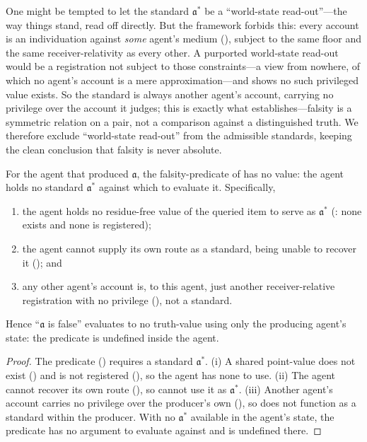 \documentclass[11pt,twocolumn,a4paper]{article}
\newcommand{\acct}{\mathfrak{a}}   %
\begin{document}
\begin{remark}
\label{rem:no-worldreadout}
One might be tempted to let the standard $\acct^\ast$ be a ``world-state
read-out''---the way things stand, read off directly. But the framework
forbids this: every account is an individuation against \emph{some} agent's
medium (), subject to the same floor and the same
receiver-relativity as every other. A purported world-state read-out would
be a registration not subject to those constraints---a view from nowhere, of
which no agent's account is a mere approximation---and 
shows no such privileged value exists. So the standard is always another
agent's account, carrying no privilege over the account it judges; this is
exactly what  establishes---falsity is a symmetric
relation on a pair, not a comparison against a distinguished truth. We
therefore exclude ``world-state read-out'' from the admissible standards,
keeping the clean conclusion that falsity is never absolute.
\end{remark}

\begin{theorem}
\label{thm:falsityundefined}
For the agent that produced $\acct$, the falsity-predicate of
 has no value: the agent holds no standard $\acct^\ast$
against which to evaluate it. Specifically,
\begin{enumerate}[label=\textup{(\roman*)},leftmargin=2.2em]
\item the agent holds no residue-free value of the queried item to serve as
$\acct^\ast$ (:
none exists and none is registered);
\item the agent cannot supply its own route as a standard, being unable to
recover it (); and
\item any other agent's account is, to this agent, just another
receiver-relative registration with no privilege (),
not a standard.
\end{enumerate}
Hence ``$\acct$ is false'' evaluates to no truth-value using only the
producing agent's state: the predicate is undefined inside the agent.
\end{theorem}

\begin{proof}
The predicate () requires a standard $\acct^\ast$. (i) A
shared point-value does not exist ()
and is not registered (), so the agent has none to use. (ii) The
agent cannot recover its own route (), so cannot use it
as $\acct^\ast$. (iii) Another agent's account carries no privilege over the
producer's own (), so does not function as a standard
within the producer. With no $\acct^\ast$ available in the agent's state,
the predicate has no argument to evaluate against and is undefined there.
\end{proof}
\end{document}
